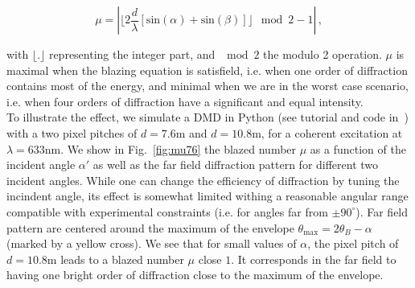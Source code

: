\documentclass[12pt]{iopart}
\begin{document}
\begin{equation}
  \mu =  
  \left|
    \lfloor 2 \frac{d}{\lambda} 
      \left[
        \text{sin}(\alpha)  +\text{sin}(\beta)
      \right] 
    \rfloor
    \mod{2} -1 
  \right| \, ,
\end{equation}

with $\lfloor . \rfloor$ representing the integer part, 
and $\mod{2}$ the modulo 2 operation.
$\mu$ is maximal when the blazing equation is satisfield, 
i.e. when one order of diffraction contains most of the energy, 
and minimal when we are in the worst case scenario, 
i.e. when four orders of diffraction have a significant and equal intensity.\\

To illustrate the effect, we simulate a DMD in Python 
(see tutorial and code in~\cite{WFSnet_diffraction})
with a two pixel pitches of 
$d=7.6$\textmu m and $d=10.8$\textmu m,
for a coherent excitation at $\lambda=633$nm. 
We show in Fig.~\ref{fig:mu76} the blazed number $\mu$
as a function of the incident angle $\alpha'$ 
as well as the far field diffraction pattern for different two incident angles.
While one can change the efficiency of diffraction by tuning 
the incindent angle, its effect is somewhat limited 
withing a reasonable angular range compatible with experimental constraints 
(i.e. for angles far from $\pm 90^\circ$).
Far field pattern are centered around the maximum of the envelope 
$\theta_\text{max} = 2\theta_B - \alpha$ 
(marked by a yellow cross).
We see that for small values of $\alpha$, 
the pixel pitch of $d=10.8$\textmu m leads to a blazed number $\mu$ 
close $1$. 
It corresponds in the far field to having one bright order of diffraction  
close to the maximum of the envelope.
\end{document}
